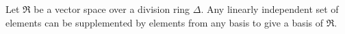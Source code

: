 Let $\Re$ be a vector space over a division ring $\Delta$. Any linearly independent set of elements can be supplemented by elements from any basis to give a basis of $\Re$.
